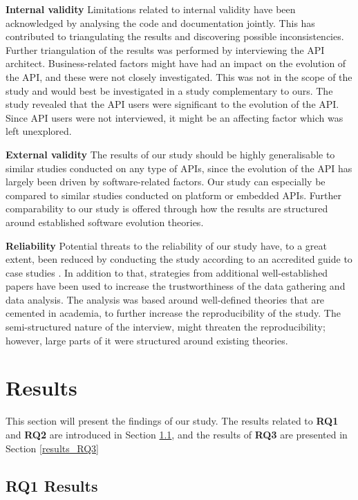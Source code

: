\documentclass{sig-alternate}
\begin{document}
\smallskip \noindent
\textbf{Internal validity  } Limitations related to internal validity have been acknowledged by analysing the code and documentation jointly. This has contributed to triangulating the results and discovering possible inconsistencies. Further triangulation of the results was performed by interviewing the API architect. Business-related factors might have had an impact on the evolution of the API, and these were not closely investigated. This was not in the scope of the study and would best be investigated in a study complementary to ours. The study revealed that the API users were significant to the evolution of the API. Since API users were not interviewed, it might be an affecting factor which was left unexplored. 

\smallskip \noindent
\textbf{External validity  } The results of our study should be highly generalisable to similar studies conducted on any type of APIs, since the evolution of the API has largely been driven by software-related factors. Our study can especially be compared to similar studies conducted on platform or embedded APIs. Further comparability to our study is offered through how the results are structured around established software evolution theories. 

\smallskip \noindent
\textbf{Reliability  } Potential threats to the reliability of our study have, to a great extent, been reduced by conducting the study according to an accredited guide to case studies \cite{runeson2009guidelines}. In addition to that, strategies from additional well-established papers \cite{andersson2007spiral, seaman1999qualitative, robson2002real} have been used to increase the trustworthiness of the data gathering and data analysis. The analysis was based around well-defined theories that are cemented in academia, to further increase the reproducibility of the study. The semi-structured nature of the interview, might threaten the reproducibility; however, large parts of it were structured around existing theories. 




\section{Results} \label{results} 
This section will present the findings of our study. The results related to \textbf{RQ1} and \textbf{RQ2} are introduced in Section \ref{results_rq1}, and the results of \textbf{RQ3} are presented in Section \ref{results_RQ3}


\subsection{RQ1 Results} \label{results_rq1}
\end{document}
